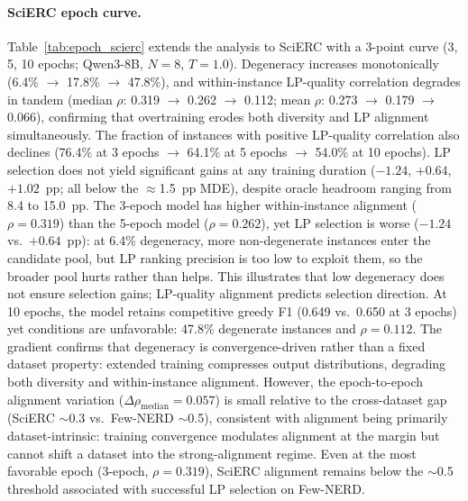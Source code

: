 \paragraph{SciERC epoch curve.}
Table~\ref{tab:epoch_scierc} extends the analysis to SciERC with a 3-point curve (3, 5, 10 epochs; Qwen3-8B, $N{=}8$, $T{=}1.0$).
Degeneracy increases monotonically (6.4\% $\to$ 17.8\% $\to$ 47.8\%), and within-instance LP-quality correlation degrades in tandem (median $\rho$: 0.319 $\to$ 0.262 $\to$ 0.112; mean $\rho$: 0.273 $\to$ 0.179 $\to$ 0.066), confirming that overtraining erodes both diversity and LP alignment simultaneously.
The fraction of instances with positive LP-quality correlation also declines (76.4\% at 3 epochs $\to$ 64.1\% at 5 epochs $\to$ 54.0\% at 10 epochs).
LP selection does not yield significant gains at any training duration ($-1.24$, $+0.64$, $+1.02$~pp; all below the ${\approx}$1.5~pp MDE), despite oracle headroom ranging from 8.4 to 15.0~pp.
The 3-epoch model has higher within-instance alignment ($\rho{=}0.319$) than the 5-epoch model ($\rho{=}0.262$), yet LP selection is worse ($-1.24$ vs.\ $+0.64$~pp): at 6.4\% degeneracy, more non-degenerate instances enter the candidate pool, but LP ranking precision is too low to exploit them, so the broader pool hurts rather than helps. This illustrates that low degeneracy does not ensure selection gains; LP-quality alignment predicts selection direction.
At 10 epochs, the model retains competitive greedy F1 (0.649 vs.\ 0.650 at 3 epochs) yet conditions are unfavorable: 47.8\% degenerate instances and $\rho{=}0.112$.
The gradient confirms that degeneracy is convergence-driven rather than a fixed dataset property: extended training compresses output distributions, degrading both diversity and within-instance alignment. However, the epoch-to-epoch alignment variation ($\Delta\rho_{\text{median}}{=}0.057$) is small relative to the cross-dataset gap (SciERC ${\sim}$0.3 vs.\ Few-NERD ${\sim}$0.5), consistent with alignment being primarily dataset-intrinsic: training convergence modulates alignment at the margin but cannot shift a dataset into the strong-alignment regime.
Even at the most favorable epoch (3-epoch, $\rho{=}0.319$), SciERC alignment remains below the ${\sim}$0.5 threshold associated with successful LP selection on Few-NERD.

